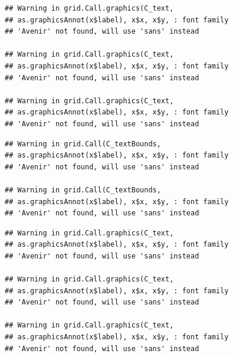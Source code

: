 \documentclass[]{krantz}
\begin{document}
\begin{verbatim}
## Warning in grid.Call.graphics(C_text,
## as.graphicsAnnot(x$label), x$x, x$y, : font family
## 'Avenir' not found, will use 'sans' instead

## Warning in grid.Call.graphics(C_text,
## as.graphicsAnnot(x$label), x$x, x$y, : font family
## 'Avenir' not found, will use 'sans' instead

## Warning in grid.Call.graphics(C_text,
## as.graphicsAnnot(x$label), x$x, x$y, : font family
## 'Avenir' not found, will use 'sans' instead
\end{verbatim}

\begin{verbatim}
## Warning in grid.Call(C_textBounds,
## as.graphicsAnnot(x$label), x$x, x$y, : font family
## 'Avenir' not found, will use 'sans' instead

## Warning in grid.Call(C_textBounds,
## as.graphicsAnnot(x$label), x$x, x$y, : font family
## 'Avenir' not found, will use 'sans' instead
\end{verbatim}

\begin{verbatim}
## Warning in grid.Call.graphics(C_text,
## as.graphicsAnnot(x$label), x$x, x$y, : font family
## 'Avenir' not found, will use 'sans' instead

## Warning in grid.Call.graphics(C_text,
## as.graphicsAnnot(x$label), x$x, x$y, : font family
## 'Avenir' not found, will use 'sans' instead

## Warning in grid.Call.graphics(C_text,
## as.graphicsAnnot(x$label), x$x, x$y, : font family
## 'Avenir' not found, will use 'sans' instead
\end{verbatim}
\end{document}
